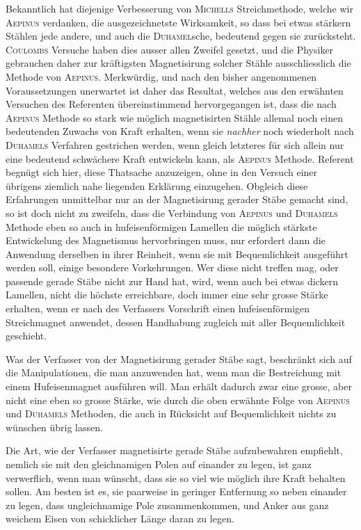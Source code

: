 Bekanntlich hat diejenige Verbesserung von \textsc{Michells} Streichmethode, welche wir \textsc{Aepinus} verdanken, die ausgezeichnetste Wirksamkeit, so dass bei etwas stärkern Stählen jede andere, und auch die \textsc{Duhamel}sche, bedeutend gegen sie zurücksteht. \textsc{Coulombs} Versuche haben dies ausser allen Zweifel gesetzt, und die Physiker gebrauchen daher zur kräftigsten Magnetisirung solcher Stähle ausschliesslich die Methode von \textsc{Aepinus}. Merkwürdig, und nach den bisher angenommenen Voraussetzungen unerwartet ist daher das Resultat, welches aus den erwähnten Versuchen des Referenten übereinstimmend hervorgegangen ist, dass die nach \textsc{Aepinus} Methode so stark wie möglich magnetisirten Stähle allemal noch einen bedeutenden Zuwachs von Kraft erhalten, wenn sie \textit{nachher} noch wiederholt nach \textsc{Duhamels} Verfahren gestrichen werden, wenn gleich letzteres für sich allein nur eine bedeutend schwächere Kraft entwickeln kann, als \textsc{Aepinus} Methode. Referent begnügt sich hier, diese Thatsache anzuzeigen, ohne in den Versuch einer übrigens ziemlich nahe liegenden Erklärung einzugehen. Obgleich diese Erfahrungen unmittelbar nur an der Magnetisirung gerader Stäbe gemacht sind, so ist doch nicht zu zweifeln, dass die Verbindung von \textsc{Aepinus} und \textsc{Duhamels} Methode eben so auch in hufeisenförmigen Lamellen die möglich stärkste Entwickelung des Magnetismus hervorbringen muss, nur erfordert dann die Anwendung derselben in ihrer Reinheit, wenn sie mit Bequemlichkeit ausgeführt werden soll, einige besondere Vorkehrungen. Wer diese nicht treffen mag, oder passende gerade Stäbe nicht zur Hand hat, wird, wenn auch bei etwas dickern Lamellen, nicht die höchste erreichbare, doch immer eine sehr grosse Stärke erhalten, wenn er nach des Verfassers Vorschrift einen hufeisenförmigen Streichmagnet anwendet, dessen Handhabung zugleich mit aller Bequemlichkeit geschieht.

Was der Verfasser von der Magnetisirung gerader Stäbe sagt, beschränkt sich auf die Manipulationen, die man anzuwenden hat, wenn man die Bestreichung mit einem Hufeisenmagnet ausführen will. Man erhält dadurch zwar eine grosse, aber nicht eine eben so grosse Stärke, wie durch die oben erwähnte Folge von \textsc{Aepinus} und \textsc{Duhamels} Methoden, die auch in Rücksicht auf Bequemlichkeit nichts zu wünschen übrig lassen.

Die Art, wie der Verfasser magnetisirte gerade Stäbe aufzubewahren empfiehlt, nemlich sie mit den gleichnamigen Polen auf einander zu legen, ist ganz verwerflich, wenn man wünscht, dass sie so viel wie möglich ihre Kraft behalten sollen. Am besten ist es, sie paarweise in geringer Entfernung so neben einander zu legen, dass ungleichnamige Pole zusammenkommen, und Anker aus ganz weichem Eisen von schicklicher Länge daran zu legen.

